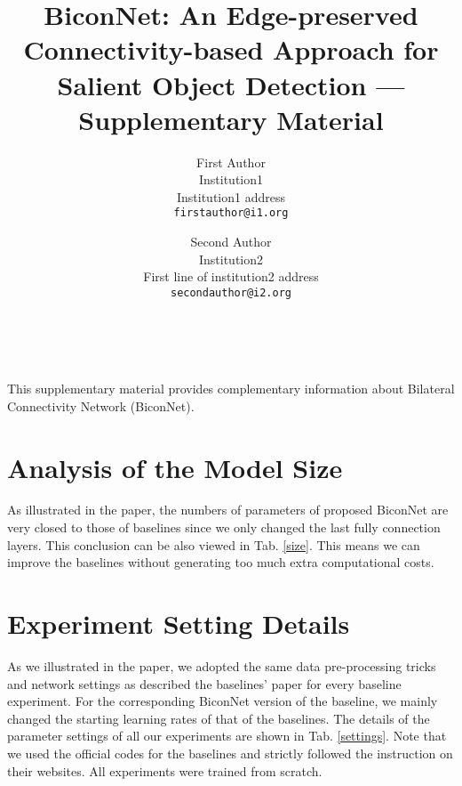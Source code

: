 \documentclass[review]{cvpr}
\begin{document}
\title{BiconNet: An Edge-preserved Connectivity-based Approach for Salient Object Detection --- Supplementary Material}

\author{First Author\\
Institution1\\
Institution1 address\\
{\tt\small firstauthor@i1.org}
\and
Second Author\\
Institution2\\
First line of institution2 address\\
{\tt\small secondauthor@i2.org}
}

\maketitle


\

This supplementary material provides complementary information about Bilateral Connectivity Network (BiconNet). 

\section{Analysis of the Model Size}
As illustrated in the paper, the numbers of parameters of proposed BiconNet are very closed to those of baselines since we only changed the last fully connection layers. This conclusion can be also viewed in Tab. \ref{size}. This means we can improve the baselines without generating too much extra computational costs.

\section{Experiment Setting Details}
As we illustrated in the paper, we adopted the same data pre-processing tricks and network settings as described the baselines' paper \cite{gcpa,poolnet,MINet,egnet,cpd,ITSD} for every baseline experiment. For the corresponding BiconNet version of the baseline, we mainly changed the starting learning rates of that of the baselines. The details of the parameter settings of all our experiments are shown in Tab. \ref{settings}. Note that we used the official codes for the baselines and strictly followed the instruction on their websites. All experiments were trained from scratch.
\
\end{document}
